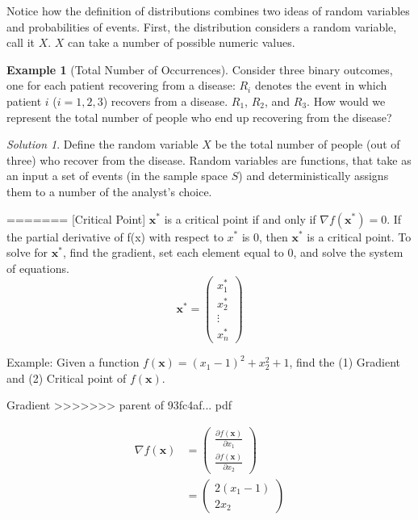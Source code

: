 \documentclass[]{book}
\theoremstyle{definition}
\theoremstyle{definition}
\newtheorem{example}{Example}[chapter]
\theoremstyle{definition}
\theoremstyle{remark}
\newtheorem*{solution}{Solution}
\begin{document}
Notice how the definition of distributions combines two ideas of random variables and probabilities of events. First, the distribution considers a random variable, call it \(X\). \(X\) can take a number of possible numeric values.

\begin{example}[Total Number of Occurrences]
\protect\hypertarget{exm:unnamed-chunk-73}{}{\label{exm:unnamed-chunk-73} {} }
Consider three binary outcomes, one for each patient recovering from a disease: \(R_i\) denotes the event in which patient \(i\) (\(i = 1, 2, 3\)) recovers from a disease. \(R_1\), \(R_2\), and \(R_3\). How would we represent the total number of people who end up recovering from the disease?
\end{example}

\begin{solution}
{}Define the random variable \(X\) be the total number of people (out of three) who recover from the disease. Random variables are functions, that take as an input a set of events (in the sample space \(S\)) and deterministically assigns them to a number of the analyst's choice.
\end{solution}
=======
[Critical Point]
\protect\hypertarget{def:unnamed-chunk-53}{}{\label{def:unnamed-chunk-53} {} }
\(\mathbf{x}^*\) is a critical point if and only if \(\nabla f(\mathbf{x}^*)=0\). If the partial derivative of f(x) with respect to \(x^*\) is 0, then \(\mathbf{x}^*\) is a critical point. To solve for \(\mathbf{x}^*\), find the gradient, set each element equal to 0, and solve the system of equations. \[\mathbf{x}^* = \begin{pmatrix} x_1^*\\x_2^*\\ \vdots \\ x_n^*\end{pmatrix}\]

\protect\hypertarget{exm:unnamed-chunk-54}{}{\label{exm:unnamed-chunk-54} }
Example: Given a function \(f(\mathbf{x})=(x_1-1)^2+x_2^2+1\), find the (1) Gradient and (2) Critical point of \(f(\mathbf{x})\).

{}Gradient
>>>>>>> parent of 93fc4af... pdf

\begin{align*}
\nabla f(\mathbf{x}) &= \begin{pmatrix}\frac{\partial f(\mathbf{x})}{\partial x_1}\\ \frac{\partial f(\mathbf{x})}{\partial x_2} \end{pmatrix}\\
&= \begin{pmatrix} 2(x_1-1)\\ 2x_2 \end{pmatrix}
\end{align*}
\end{document}
